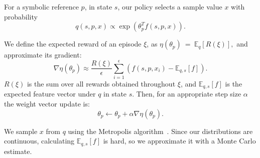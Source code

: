 For a symbolic reference $p$, in state $s$, our policy selects a
sample value $x$ with probability
$$q(s, p, x) \propto \exp(\theta_{p}^{T} f(s, p, x)).$$

We define the expected reward of an episode $\xi$, as
$\eta(\theta_{p})~=~\mathbb{E}_{q}[R(\xi)],$ and approximate its
gradient:
$$\nabla \eta(\theta_{p}) \approx \frac{R(\xi)}{\epsilon}
\sum_{i=1}^{\epsilon}(f(s, p, x_{i}) - \mathbb{E}_{q,s}[f]).$$
$R(\xi)$ is the sum over all rewards obtained throughout $\xi$, and
$\mathbb{E}_{q,s}[f]$ is the expected feature vector under $q$ in
state $s$. Then, for an appropriate step size $\alpha$ the weight
vector update is:
$$\theta_{p} \leftarrow \theta_{p} + \alpha \nabla \eta(\theta_{p}).$$

We sample $x$ from $q$ using the Metropolis algorithm~\cite{chib1995understanding}.
Since our distributions are continuous, calculating $\mathbb{E}_{q,s}[f]$ is hard,
so we approximate it with a Monte Carlo estimate.
